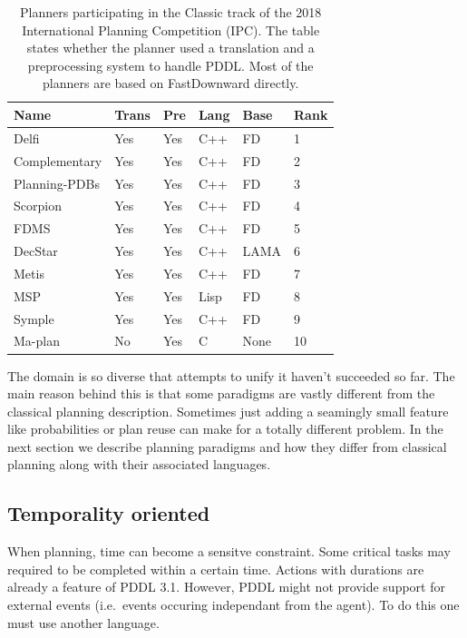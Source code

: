 \documentclass[11pt,a4paper,twoside,openright,titlepage,numbers=noenddot,headinclude,cleardoublepage=empty,openany]{scrreprt}
\theoremstyle{plain}
\theoremstyle{definition}
\theoremstyle{remark}
\begin{document}
\hypertarget{tbl:ipc}{}
\begin{table}\footnotesize
\centering

\caption{\label{tbl:ipc}Planners participating in the Classic track of
the 2018 International Planning Competition (IPC). The table states
whether the planner used a translation and a preprocessing system to
handle PDDL. Most of the planners are based on FastDownward directly.}

\begin{tabular}{@{}llllll@{}}
\toprule

Name & Trans & Pre & Lang & Base & Rank \\\midrule

Delfi & Yes & Yes & C++ & FD & 1 \\
Complementary & Yes & Yes & C++ & FD & 2 \\
Planning-PDBs & Yes & Yes & C++ & FD & 3 \\
Scorpion & Yes & Yes & C++ & FD & 4 \\
FDMS & Yes & Yes & C++ & FD & 5 \\
DecStar & Yes & Yes & C++ & LAMA & 6 \\
Metis & Yes & Yes & C++ & FD & 7 \\
MSP & Yes & Yes & Lisp & FD & 8 \\
Symple & Yes & Yes & C++ & FD & 9 \\
Ma-plan & No & Yes & C & None & 10 \\

\bottomrule
\end{tabular}

\end{table}

The domain is so diverse that attempts to unify it haven't succeeded so
far. The main reason behind this is that some paradigms are vastly
different from the classical planning description. Sometimes just adding
a seamingly small feature like probabilities or plan reuse can make for
a totally different problem. In the next section we describe planning
paradigms and how they differ from classical planning along with their
associated languages.

\hypertarget{temporality-oriented}{%
\subsection{Temporality oriented}\label{temporality-oriented}}

When planning, time can become a sensitve constraint. Some critical
tasks may required to be completed within a certain time. Actions with
durations are already a feature of PDDL 3.1. However, PDDL might not
provide support for external events (i.e.~events occuring independant
from the agent). To do this one must use another language.
\end{document}
